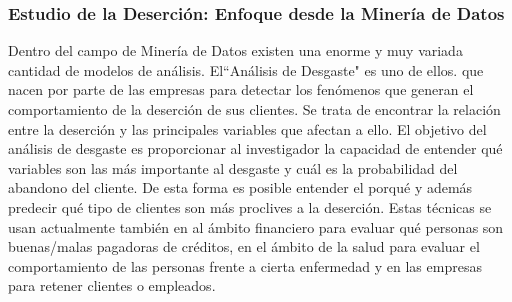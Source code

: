 \subsubsection{Estudio de la Deserción: Enfoque desde la Minería de Datos }\label{seccion:dm_en_desercion}
Dentro del campo de Minería de Datos existen una enorme y muy variada cantidad de modelos de análisis. El``Análisis de Desgaste" es uno de ellos. que nacen por parte de las empresas para detectar los fenómenos que generan el comportamiento de la deserción de sus clientes. Se trata de encontrar la relación entre la deserción y las principales variables que afectan a ello. El objetivo del análisis de desgaste es proporcionar al investigador la capacidad de entender qué variables son las más importante al desgaste y cuál es la probabilidad del abandono del cliente. De esta forma es posible entender el porqué y además predecir qué tipo de clientes son más proclives a la deserción. Estas técnicas se usan actualmente también en al ámbito financiero para evaluar qué personas son buenas/malas pagadoras de créditos, en el ámbito de la salud para evaluar el comportamiento de las personas frente a cierta enfermedad y en las empresas para retener clientes o empleados\cite{Chapman1982AttritionAnalysis}.

